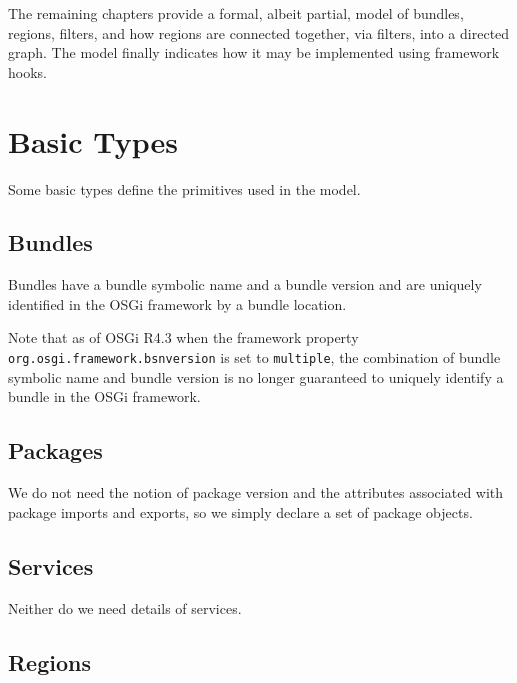 \documentclass[a4paper,9pt]{article}
\begin{document}
The remaining chapters provide a formal, albeit partial, model of bundles, regions, filters, and how
regions are connected together, via filters, into a directed graph.
The model finally indicates how it may be implemented using framework hooks.

\clearpage
\section{Basic Types}
\label{cha:basics}

Some basic types define the primitives used in the model.

\subsection*{Bundles}

Bundles have a bundle symbolic name and a bundle version and are uniquely identified in the
OSGi framework by a bundle location.
\begin{zed}
\end{zed}
Note that as of OSGi R4.3 when the framework property \texttt{org.osgi.framework.bsnversion}
is set to \texttt{multiple}, the combination of bundle symbolic name and bundle version is no
longer guaranteed to uniquely identify a bundle in the OSGi framework.

\subsection*{Packages}

We do not need the notion of package version and the attributes associated with package imports
and exports, so we simply declare a set of package objects.
\begin{zed}
  [Package]
\end{zed}

\subsection*{Services}

Neither do we need details of services.
\begin{zed}
  [Service]
\end{zed}

\subsection*{Regions}
\end{document}
